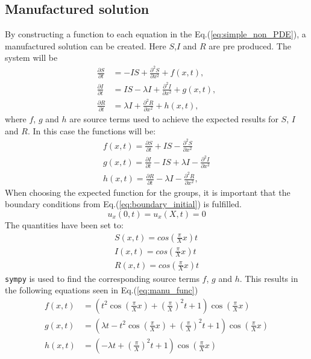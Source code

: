\documentclass[%
twoside,                 %
final,                   %
chapterprefix=true,      %
open=right               %
10pt]{book}
\begin{document}
\subsection{Manufactured solution}
By constructing a function to each equation in the Eq.(\ref{eq:simple_non_PDE}), a manufactured solution can be created. Here $S$,$I$ and $R$ are pre produced. The system will be
\begin{equation} \label{eq:simple_non_PDE3}
	\begin{aligned}
	\frac{\partial S}{\partial t} &= -IS + \frac{\partial^2 S}{\partial x^2}+f(x,t),\\
	\frac{\partial I}{\partial t} &= IS- \lambda I + \frac{\partial^2 I}{\partial x^2}+g(x,t),\\
	\frac{\partial R}{\partial t} &= \lambda I + \frac{\partial^2 R}{\partial x^2}+h(x,t),
	\end{aligned}
\end{equation}
where $f$, $g$ and $h$ are source terms used to achieve the expected results for $S$, $I$ and $R$. In this case the functions will be:
\begin{equation}
	\begin{aligned}
	f(x,t) = \frac{\partial S}{\partial t} + IS - \frac{\partial^2 S}{\partial x^2}\\
	g(x,t) = \frac{\partial I}{\partial t} - IS + \lambda I - \frac{\partial^2 I}{\partial x^2}\\
	h(x,t) = \frac{\partial R}{\partial t} -\lambda I - \frac{\partial^2 R}{\partial x^2},
	\end{aligned}
\end{equation}
When choosing the expected function for the groups, it is important that the boundary conditions from Eq.(\ref{eq:boundary_initial}) is fulfilled.
\begin{equation}
    u_x(0,t) = u_x(X,t) = 0
\end{equation}
The quantities have been set to:
\begin{equation}
	\begin{aligned}
    S(x,t) = cos(\frac{\pi}{X}x)t\\
    I(x,t) = cos(\frac{\pi}{X}x)t\\
    R(x,t) = cos(\frac{\pi}{X}x)t
	\end{aligned}
\end{equation}
\Verb!sympy! is used to find the corresponding source terms $f$, $g$ and $h$. This results in the following equations seen in Eq.(\ref{eq:manu_func}) 
\begin{equation} \label{eq:manu_func}
	\begin{aligned}
	f(x,t) &= (t^2\cos(\frac{\pi}{X} x) + (\frac{\pi}{X})^2t + 1)\cos(\frac{\pi}{X} x)\\
	g(x,t) &= (\lambda t - t^2\cos(\frac{\pi}{X} x) + (\frac{\pi}{X})^2t + 1)\cos(\frac{\pi}{X} x)\\
	h(x,t) &= (-\lambda t + (\frac{\pi}{X})^2t + 1)\cos(\frac{\pi}{X} x)
	\end{aligned}
\end{equation}
\end{document}
